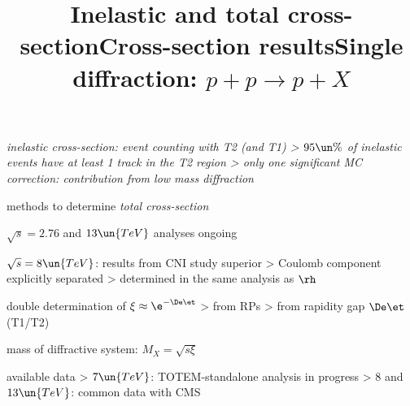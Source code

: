 \centerline{%
	\hskip1mm
}


\newpage %
\title{Inelastic and total cross-section}

\> \em{inelastic cross-section}: event counting with T2 (and T1)
\>> $95\un{\%}$ of inelastic events have at least 1 track in the T2 region
\>> only one significant MC correction: contribution from low mass diffraction

 methods to determine \em{total cross-section}

\centerline{}



\newpage %
\title{Cross-section results}

\centerline{%
	\hskip2mm
}

\> $\sqrt s = 2.76$ and $13\un{TeV}$ analyses ongoing

\> $\sqrt s = 8\un{TeV}$: results from CNI study superior
\>> Coulomb component explicitly separated
\>> determined in the same analysis as $\rh$


\newpage %
\title{Single diffraction: $p + p \rightarrow p + X$}

\centerline{}

\> double determination of $\xi \approx \e^{-\De\et}$
\>> from RPs
\>> from rapidity gap $\De\et$ (T1/T2)

\> mass of diffractive system: \cBlack $M_X = \sqrt{s \xi}$ 

\> available data
\>> $7\un{TeV}$: TOTEM-standalone analysis in progress
\>> $8$ and $13\un{TeV}$: common data with CMS

